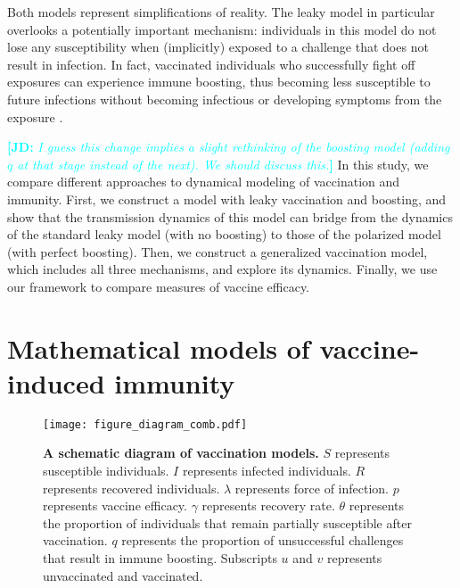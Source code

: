 \documentclass[12pt]{article}
\newcommand{\comment}{\showcomment}
\newcommand{\showcomment}[3]{\textcolor{#1}{\textbf{[#2: }\textsl{#3}\textbf{]}}}
\newcommand{\jd}[1]{\comment{cyan}{JD}{#1}}
\begin{document}
Both models represent simplifications of reality.
The leaky model in particular overlooks a potentially important mechanism: individuals in this model do not lose any susceptibility when (implicitly) exposed to a challenge that does not result in infection. 
In fact, vaccinated individuals who successfully fight off exposures can experience immune boosting, thus becoming less susceptible to future infections without becoming infectious or developing symptoms from the exposure \citep{lavine2011natural,yang2020waning}.

\jd{I guess this change implies a slight rethinking of the boosting model (adding $q$ at that stage instead of the next). We should discuss this.}
In this study, we compare different approaches to dynamical modeling of vaccination and immunity.
First, we construct a model with leaky vaccination and boosting, and show that the transmission dynamics of this model can bridge from the dynamics of the standard leaky model (with no boosting) to those of the polarized model (with perfect boosting). 
Then, we construct a generalized vaccination model, which includes all three mechanisms, and explore its dynamics.
Finally, we use our framework to compare measures of vaccine efficacy.

\section*{Mathematical models of vaccine-induced immunity}

\begin{figure}[!th]
\texttt{[image: figure\_diagram\_comb.pdf]}
\caption{
\textbf{A schematic diagram of vaccination models.}
$S$ represents susceptible individuals. $I$ represents infected individuals. $R$ represents recovered individuals.
$\lambda$ represents force of infection. 
$p$ represents vaccine efficacy.
$\gamma$ represents recovery rate.
$\theta$ represents the proportion of individuals that remain partially susceptible after vaccination.
$q$ represents the proportion of unsuccessful challenges that result in immune boosting.
Subscripts $u$ and $v$ represents unvaccinated and vaccinated.
\label{fig:diagram}
}
\end{figure}
\end{document}

